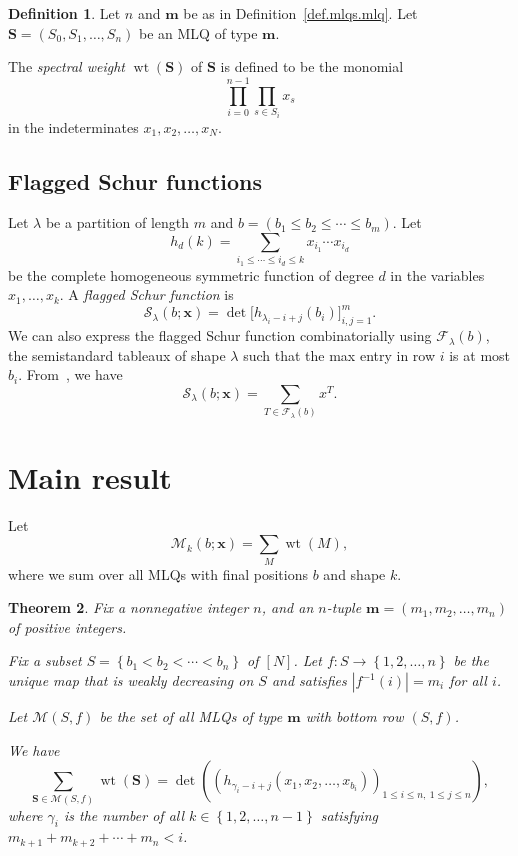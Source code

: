 \documentclass[reqno]{amsart}
\newcommand{\fs}{\mathcal{S}} %
\DeclareMathOperator{\wt}{wt} %
\newcommand{\xx}{\mathbf{x}}
\newcommand{\mm}{\mathbf{m}}
\newcommand{\MLQ}{\mathbf{S}}
\newcommand{\mcF}{\mathcal{F}}
\newcommand{\mcM}{\mathcal{M}}
\let\sumnonlimits\sum
\let\prodnonlimits\prod
\renewcommand{\sum}{\sumnonlimits\limits}
\renewcommand{\prod}{\prodnonlimits\limits}
\newcommand{\set}[1]{\left\{ #1 \right\}}
\newcommand{\abs}[1]{\left| #1 \right|}
\newcommand{\tup}[1]{\left( #1 \right)}
\newcommand{\ive}[1]{\left[ #1 \right]}
\newcommand{\defn}[1]{{\color{darkred}\emph{#1}}} %
\theoremstyle{plain}
\newtheorem{thm}{Theorem}[section]
\theoremstyle{definition}
\newtheorem{dfn}[thm]{Definition}
\numberwithin{equation}{section}
\begin{document}
\begin{dfn} \label{def.mlq.sw}
Let $n$ and $\mm$ be as in Definition~\ref{def.mlqs.mlq}.
Let $\MLQ = \tup{S_0, S_1, \ldots, S_n}$ be an MLQ of type $\mm$.

The \defn{spectral weight} $\wt\tup{\MLQ}$
of $\MLQ$ is defined to be the
monomial
\[
 \prod_{i=0}^{n-1} \prod_{s \in S_i} x_s
\]
in the indeterminates $x_1, x_2, \ldots, x_N$.
\end{dfn}


\subsection{Flagged Schur functions}

Let $\lambda$ be a partition of length $m$ and $b = (b_1 \leq b_2 \leq \cdots \leq b_m)$.
Let
\[
h_d(k) = \sum_{i_1 \leq \cdots \leq i_d \leq k} x_{i_1} \cdots x_{i_d}
\]
be the complete homogeneous symmetric function of degree $d$ in the variables $x_1, \dotsc, x_k$.
A \defn{flagged Schur function} is
\[
\fs_{\lambda}(b; \xx) = \det\big[ h_{\lambda_i - i + j}(b_i) \bigr]_{i,j=1}^m.
\]
We can also express the flagged Schur function combinatorially using $\mcF_{\lambda}(b)$, the semistandard tableaux of shape $\lambda$ such that the max entry in row $i$ is at most $b_i$.
From~\cite{Wachs85}, we have
\[
\fs_{\lambda}(b; \xx) = \sum_{T \in \mcF_{\lambda}(b)} x^T.
\]








\section{Main result}
\label{sec:result}


Let
\[
\mcM_k(b; \xx) = \sum_M \wt(M),
\]
where we sum over all MLQs with final positions $b$ and shape $k$.

\begin{thm} \label{thm.decreasing}
Fix a nonnegative integer $n$,
and an $n$-tuple $\mm = \tup{m_1, m_2, \ldots, m_n}$ of positive
integers.

Fix a subset $S = \set{b_1 < b_2 < \cdots < b_n}$ of $\ive{N}$.
Let $f : S \to \set{1, 2, \ldots, n}$ be the unique
map that is weakly decreasing on $S$ and satisfies
$\abs{f^{-1} \tup{i}} = m_i$ for all $i$.

Let $\mcM \tup{S, f}$ be the set of all MLQs of type $\mm$
with bottom row $\tup{S, f}$.

We have
\[
\sum_{\MLQ \in \mcM \tup{S, f}} \wt\tup{\MLQ}
= \det \tup{
             \tup{ h_{\gamma_i - i + j} \tup{x_1, x_2, \ldots, x_{b_i}}
                 }_{1 \leq i \leq n, \  1 \leq j \leq n}
           },
\]
where $\gamma_i$ is the number of all
$k \in \set{1, 2, \ldots, n-1}$ satisfying
$m_{k + 1} + m_{k + 2} + \cdots + m_n < i$.
\end{thm}
\end{document}
